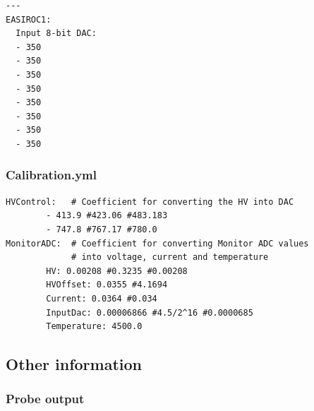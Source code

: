 \begin{shadebox}
\begin{verbatim}
---
EASIROC1:
  Input 8-bit DAC:
  - 350
  - 350
  - 350
  - 350
  - 350
  - 350
  - 350
  - 350
\end{verbatim}
\end{shadebox}

\subsubsection{Calibration.yml}

\begin{shadebox}
\begin{verbatim}
HVControl:   # Coefficient for converting the HV into DAC
        - 413.9 #423.06 #483.183
        - 747.8 #767.17 #780.0
MonitorADC:  # Coefficient for converting Monitor ADC values
             # into voltage, current and temperature
        HV: 0.00208 #0.3235 #0.00208
        HVOffset: 0.0355 #4.1694
        Current: 0.0364 #0.034
        InputDac: 0.00006866 #4.5/2^16 #0.0000685
        Temperature: 4500.0
\end{verbatim}
\end{shadebox}

\newpage
\subsection{Other information}

\subsubsection{Probe output}


